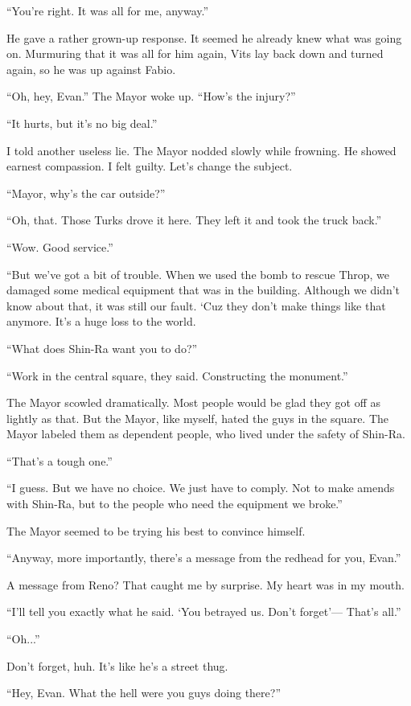 \documentclass[oneside]{book}
\begin{document}
“You’re right. It was all for me, anyway.”

He gave a rather grown-up response. It seemed he already knew what was going on. Murmuring that it was all for him again, Vits lay back down and turned again, so he was up against Fabio.

“Oh, hey, Evan.” The Mayor woke up. “How’s the injury?”

“It hurts, but it’s no big deal.”

I told another useless lie. The Mayor nodded slowly while frowning. He showed earnest compassion. I felt guilty. Let’s change the subject.

“Mayor, why’s the car outside?”

“Oh, that. Those Turks drove it here. They left it and took the truck back.”

“Wow. Good service.”

“But we’ve got a bit of trouble. When we used the bomb to rescue Throp, we damaged some medical equipment that was in the building. Although we didn’t know about that, it was still our fault. ‘Cuz they don’t make things like that anymore. It’s a huge loss to the world.

“What does Shin-Ra want you to do?”

“Work in the central square, they said. Constructing the monument.”

The Mayor scowled dramatically. Most people would be glad they got off as lightly as that. But the Mayor, like myself, hated the guys in the square. The Mayor labeled them as dependent people, who lived under the safety of Shin-Ra.

“That’s a tough one.”

“I guess. But we have no choice. We just have to comply. Not to make amends with Shin-Ra, but to the people who need the equipment we broke.”

The Mayor seemed to be trying his best to convince himself.

“Anyway, more importantly, there’s a message from the redhead for you, Evan.”

A message from Reno? That caught me by surprise. My heart was in my mouth.

“I’ll tell you exactly what he said. ‘You betrayed us. Don’t forget’— That’s all.”

“Oh...”

Don’t forget, huh. It’s like he’s a street thug.

“Hey, Evan. What the hell were you guys doing there?”
\end{document}
